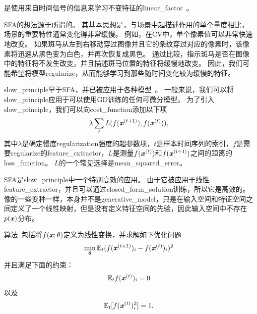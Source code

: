 \section{}
\label{sec:slow_feature_analysis}


是使用来自时间信号的信息来学习不变特征的\gls{linear_factor}~\citep{WisSej2002}。


\gls{SFA}的想法源于所谓的。
其基本思想是，与场景中起描述作用的单个量度相比，场景的重要特性通常变化得非常缓慢。
例如，在\gls{CV}中，单个像素值可以非常快速地改变。
如果斑马从左到右移动穿过图像并且它的条纹穿过对应的像素时，该像素将迅速从黑色变为白色，并再次恢复成黑色。
通过比较，指示斑马是否在图像中的特征将不发生改变，并且描述斑马位置的特征将缓慢地改变。
因此，我们可能希望将模型\gls{regularize}，从而能够学习到那些随时间变化较为缓慢的特征。


\gls{slow_principle}早于\gls{SFA}，并已被应用于各种模型~\citep{Hinton89b,Foldiak89,MobahiCollobertWestonICML2009,Bergstra+Bengio-2009}。
一般来说，我们可以将\gls{slow_principle}应用于可以使用\gls{GD}训练的任何可微分模型。 
为了引入\gls{slow_principle}，我们可以向\gls{cost_function}添加以下项
\begin{align}
\label{eqn:137}
\lambda \sum_t L(f(\boldsymbol{\mathit{x}}^{(t+1)}),f(\boldsymbol{\mathit{x}}^{(t)})),
\end{align}
其中$\lambda$是确定慢度\gls{regularization}强度的超参数项，$t$是样本时间序列的索引，$f$是需要\gls{regularize}的\gls{feature_extractor}，$L$是测量$f(\boldsymbol{\mathit{x}}^{(t)})$和$f(\boldsymbol{\mathit{x}}^{(t+1)})$之间的距离的\gls{loss_function}。
$L$的一个常见选择是\gls{mean_squared_error}。


\gls{SFA}是\gls{slow_principle}中一个特别高效的应用。
由于它被应用于线性\gls{feature_extractor}，并且可以通过\gls{closed_form_solution}训练，所以它是高效的。
像的一些变种一样，本身并不是\gls{generative_model}，只是在输入空间和特征空间之间定义了一个线性映射，但是没有定义特征空间的先验，因此输入空间中不存在$p(\boldsymbol{\mathit{x}})$分布。



算法~\citep{WisSej2002}包括将$f(\boldsymbol{\mathit{x}};\theta)$定义为线性变换，并求解如下优化问题
\begin{align}
	\label{eqn:138}
	\min_{\boldsymbol{\theta}} \mathbb{E}_t  (f(\boldsymbol{\mathit{x}}^{(t+1)})_i - f(\boldsymbol{\mathit{x}}^{(t)})_i  )^2
\end{align}
并且满足下面的约束：
\begin{align}
	\label{eqn:139}
	\mathbb{E}_t  f(\boldsymbol{\mathit{x}}^{(t)})_i = 0 
\end{align}
以及
\begin{align}
	\label{eqn:1310}
	\mathbb{E}_t [ f(\boldsymbol{\mathit{x}}^{(t)})_i^2 ] =1. 
\end{align}


